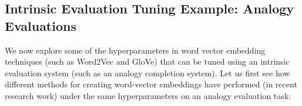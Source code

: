 \documentclass{tufte-handout}
\begin{document}
\subsection{Intrinsic Evaluation Tuning Example: Analogy Evaluations}


We now explore some of the hyperparameters in word vector embedding techniques (such as Word2Vec and GloVe) that can be tuned using an intrinsic evaluation system (such as an analogy completion system). Let us first see how different methods for creating word-vector embeddings have performed (in recent research work) under the same hyperparameters on an analogy evaluation task:
\end{document}
